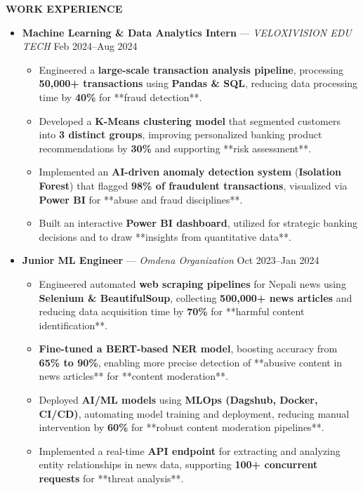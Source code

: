 \documentclass[a4paper,10pt]{article}
\newcommand{\resheading}[1]{%
  \vspace{1em}%
  \noindent\colorbox{mygrey}{%
    \parbox{\dimexpr\linewidth-2\fboxsep\relax}{%
      \textbf{#1}%
    }%
  }%
  \vspace{0.6em}%
}
\begin{document}
\resheading{WORK EXPERIENCE}
\vspace{0.4em}
\begin{itemize}
  \item \textbf{Machine Learning \& Data Analytics Intern} — \textit{VELOXIVISION EDU TECH} \hfill Feb 2024–Aug 2024
  \begin{itemize}
    \item Engineered a \textbf{large-scale transaction analysis pipeline}, processing \textbf{50,000+ transactions} using \textbf{Pandas \& SQL}, reducing data processing time by \textbf{40\%} for **fraud detection**.
    \item Developed a \textbf{K-Means clustering model} that segmented customers into \textbf{3 distinct groups}, improving personalized banking product recommendations by \textbf{30\%} and supporting **risk assessment**.
    \item Implemented an \textbf{AI-driven anomaly detection system} (\textbf{Isolation Forest}) that flagged \textbf{98\% of fraudulent transactions}, visualized via \textbf{Power BI} for **abuse and fraud disciplines**.
    \item Built an interactive \textbf{Power BI dashboard}, utilized for strategic banking decisions and to draw **insights from quantitative data**.
  \end{itemize}

  \item \textbf{Junior ML Engineer} — \textit{Omdena Organization} \hfill Oct 2023–Jan 2024
  \begin{itemize}
    \item Engineered automated \textbf{web scraping pipelines} for Nepali news using \textbf{Selenium \& BeautifulSoup}, collecting \textbf{500,000+ news articles} and reducing data acquisition time by \textbf{70\%} for **harmful content identification**.
    \item \textbf{Fine-tuned a BERT-based NER model}, boosting accuracy from \textbf{65\% to 90\%}, enabling more precise detection of **abusive content in news articles** for **content moderation**.
    \item Deployed \textbf{AI/ML models} using \textbf{MLOps (Dagshub, Docker, CI/CD)}, automating model training and deployment, reducing manual intervention by \textbf{60\%} for **robust content moderation pipelines**.
    \item Implemented a real-time \textbf{API endpoint} for extracting and analyzing entity relationships in news data, supporting \textbf{100+ concurrent requests} for **threat analysis**.
  \end{itemize}


\end{itemize}
\end{document}

